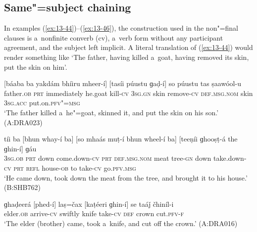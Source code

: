 \subsection{Same"=subject chaining}
\label{subsec:13-3-1}

In examples (\ref{ex:13-44})--(\ref{ex:13-46}), the construction used in the non"=final clauses is a~nonfinite converb (cv), a~verb form without any participant agreement, and the subject left implicit. A literal translation of (\ref{ex:13-44}) would render something like `The father, having killed a~goat, having removed its skin, put the skin on him'. 

\begin{exe}
\ex
\label{ex:13-44}
\gll \label{bkm:Ref190770484}[báaba ba yakdám bhíiru mheer-í] [tasíi púustu ɡaḍ-í] so púustu tas ṣaawóol-u  \\
father.\textsc{ob} \textsc{prt} immediately he.goat kill-\textsc{cv} \textsc{3sg.gn} skin  remove-\textsc{cv} \textsc{def.msg.nom} skin \textsc{3sg.acc} put.on.\textsc{pfv"=msg} \\
\glt `The father killed a~he"=goat, skinned it, and put the skin on his son.' (A:DRA023)

\ex
\label{ex:13-45}
\gll tíi ba [bhun whay-í ba] [so  mhaás muṭ-í bhun wheel-í ba] [teeṇíi
  ɡhooṣṭ-á the ɡhin-í] ɡáu \\
\textsc{3sg.ob} \textsc{prt} down come.down-\textsc{cv} \textsc{prt} \textsc{def.msg.nom}  meat tree-\textsc{gn} down take.down-\textsc{cv} \textsc{prt} \textsc{refl} house-\textsc{ob}  to take-\textsc{cv} go.\textsc{pfv.msg} \\
\glt `He came down, took down the meat from the tree, and brought it to his house.' (B:SHB762)

\ex
\label{ex:13-46}
\gll ɡhaḍeerá [phed-í] laṣ=čax [kaṭéeri ɡhin-í] se taáǰ čhiníl-i  \\
elder.\textsc{ob} arrive-\textsc{cv} swiftly knife take-\textsc{cv} \textsc{def} crown cut.\textsc{pfv-f} \\
\glt `The elder (brother) came, took a~knife, and cut off the crown.' (A:DRA016) 
\end{exe}

